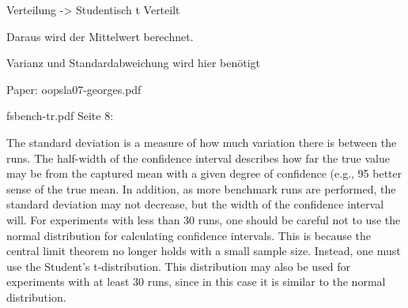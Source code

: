 Verteilung -> Studentisch t Verteilt

Daraus wird der Mittelwert berechnet.

Varianz und Standardabweichung wird hier benötigt

Paper: oopsla07-georges.pdf

fsbench-tr.pdf Seite 8:

The standard deviation is a measure of how much variation there is between the
runs. The half-width of the confidence interval describes how far the true value may be
from the captured mean with a given degree of confidence (e.g., 95%
better sense of the true mean. In addition, as more benchmark runs are performed, the
standard deviation may not decrease, but the width of the confidence interval will.
For experiments with less than 30 runs, one should be careful not to use the normal
distribution for calculating confidence intervals. This is because the central limit theorem
no longer holds with a small sample size. Instead, one must use the Student’s t-distribution.
This distribution may also be used for experiments with at least 30 runs, since in this case
it is similar to the normal distribution.